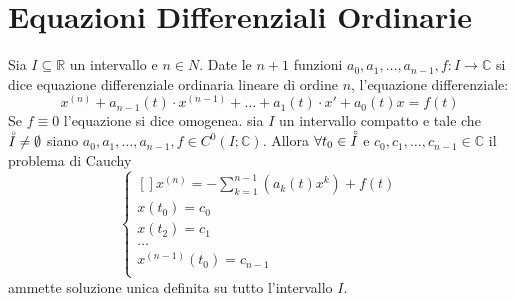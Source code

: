 \section{Equazioni Differenziali Ordinarie}
Sia $I\subseteq\mathbb{R}$ un intervallo e $n\in N$. Date le $n+1$ funzioni $a_0,a_1,\ldots,a_{n-1}, f:I\to\mathbb{C}$ si dice equazione differenziale ordinaria lineare di ordine $n$, l'equazione differenziale:
$$x^{(n)}+a_{n-1}(t)\cdot x^{(n-1)}+\ldots+a_1(t)\cdot x'+a_0(t)x=f(t)$$
Se $f\equiv 0 $ l'equazione si dice omogenea.
\proposition
sia $I$ un intervallo compatto e tale che $\accentset{\circ}{I}\ne \emptyset$ siano $a_0,a_1,\ldots,a_{n-1},f\in C^0(I;\mathbb{C})$. Allora $\forall t_0\in\accentset{\circ}{I}$ e $c_0,c_1,\ldots,c_{n-1}\in\mathbb{C}$ il problema di Cauchy 
$$ \left\{\begin{matrix}[]
x^{(n)}=-\sum\limits_{k=1}^{n-1}\left(a_k(t)x^k\right)+f(t)\\
x(t_0)=c_0\\
x(t_2)=c_1\\
\ldots\\
x^{(n-1)}(t_0)=c_{n-1}\\
\end{matrix}\right.$$
ammette soluzione unica definita su tutto l'intervallo $I$.
